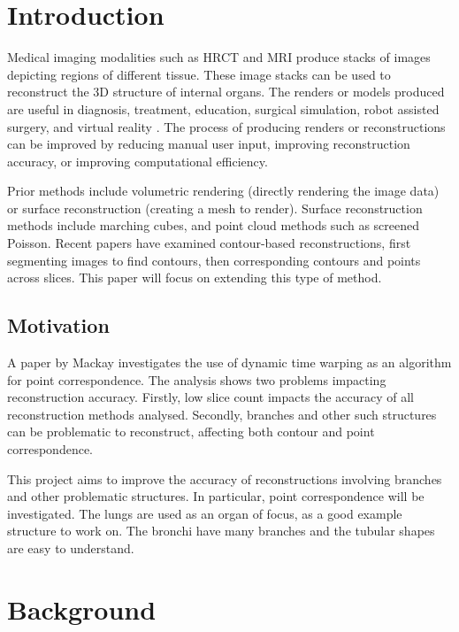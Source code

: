 \documentclass[11p, titlepage]{article}
\begin{document}
\section{Introduction}

Medical imaging modalities such as HRCT and MRI produce stacks of images depicting regions of different tissue. These image stacks can be used to reconstruct the 3D structure of internal organs. The renders or models produced are useful in diagnosis, treatment, education, surgical simulation, robot assisted surgery, and virtual reality \cite{mackay2019robust, mukundan2016reconstruction, pan2017comparison, lobachev2021inspection}. The process of producing renders or reconstructions can be improved by reducing manual user input, improving reconstruction accuracy, or improving computational efficiency.

Prior methods include volumetric rendering (directly rendering the image data) or surface reconstruction (creating a mesh to render). Surface reconstruction methods include marching cubes, and point cloud methods such as screened Poisson. Recent papers \cite{mackay2019robust, mukundan2016reconstruction} have examined contour-based reconstructions, first segmenting images to find contours, then corresponding contours and points across slices. This paper will focus on extending this type of method.

\subsection{Motivation}

A paper by Mackay \cite{mackay2019robust} investigates the use of dynamic time warping as an algorithm for point correspondence. The analysis shows two problems impacting reconstruction accuracy. Firstly, low slice count impacts the accuracy of all reconstruction methods analysed. Secondly, branches and other such structures can be problematic to reconstruct, affecting both contour and point correspondence.

This project aims to improve the accuracy of reconstructions involving branches and other problematic structures. In particular, point correspondence will be investigated. The lungs are used as an organ of focus, as a good example structure to work on. The bronchi have many branches and the tubular shapes are easy to understand.
\pagebreak

\section{Background}
\end{document}
